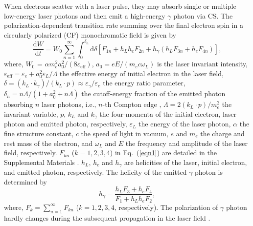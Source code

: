\documentclass[10pt,twocolumn,showpacs,amsmath,amssymb,floatfix,superscriptaddress]{revtex4-2}
\begin{document}
When electrons scatter with a laser pulse, they may absorb single or multiple low-energy laser photons and then emit a high-energy $\gamma$ photon via CS. The polarization-dependent transition rate summing over the final electron spin in a circularly polarized (CP) monochromatic field is given by \cite{CAIN242,Ivanov2004}
\begin{equation}
\frac{\mathrm{d}W}{\mathrm{d}t} = W_0\sum_{n=1}^{\infty} \int_{0}^{\delta_n} \mathrm{d} \delta[F_{1n}+h_L h_e F_{2n}+h_\gamma (h_L F_{3n}+h_e F_{4n})], \label{eqn1}
\end{equation}  
where, $W_0$ = $\alpha m_e^2 a_0^2/(8\varepsilon_\mathrm{eff})$, $a_0 = e E / (m_e c \omega_L)$ is the laser invariant intensity, $\varepsilon_\mathrm{eff} = \varepsilon_e+a_0^2 \varepsilon_L/\Lambda$ the effective energy of initial electron in the laser field, $\delta=(k_L \cdot k_\gamma)/(k_L \cdot p) \approx \varepsilon_\gamma/\varepsilon_e$ the energy ratio parameter, $\delta_n = n \Lambda / (1+a_0^2+n \Lambda)$ the cutoff-energy fraction of the emitted photon absorbing $n$ laser photons, i.e., $n$-th Compton edge \cite{Ivanov2004}, $\Lambda=2(k_L \cdot p)/m_e^2$ the invariant variable, $p$, $k_L$ and $k_\gamma$ the four-momenta of the initial electron, laser photon and emitted photon, respectively, $\varepsilon_L$ the energy of the laser photon, $\alpha$ the fine structure constant, $c$ the speed of light in vacuum, $e$ and $m_e$ the charge and rest mass of the electron, and $\omega_L$ and $E$ the frequency and amplitude of the laser field, respectively. $F_{kn}$ ($k = 1,2,3,4$) in Eq.~(\ref{eqn1}) are detailed in the Supplemental Materials \cite{Supplemental}. $h_L$, $h_e$ and $h_\gamma$ are helicities of the laser, initial electron, and emitted photon, respectively. The helicity of the emitted $\gamma$ photon is determined by \cite{CAIN242,Ivanov2004}
\begin{equation}
h_\gamma = \frac{h_LF_3+h_eF_4}{F_1+h_Lh_eF_2}, \label{eqn2} 
\end{equation}
where, $F_k = \sum_{n=1}^{\infty} F_{kn}$ ($k=1,2,3,4$, respectively). The polarization of $\gamma$ photon hardly changes during the subsequent propagation in the laser field \cite{CAIN242,Ivanov2005,Supplemental}.
\end{document}
